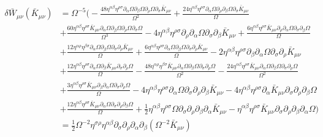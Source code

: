 \documentclass[10pt,letterpaper]{article}
\newcommand{\pd}{\partial}
\numberwithin{equation}{section}
\begin{document}
\begin{align}
	\delta \bar W_{\mu\nu}(\bar K_{\mu\nu})&= 
\Omega^{-5}\bigg(- \frac{48 \eta^{\alpha \beta} \eta^{\rho \sigma} \partial_{\alpha}\Omega \partial_{\beta}\Omega \partial_{\rho}\Omega \partial_{\sigma}\bar K_{\mu \nu}}{\Omega^2} + \frac{24 \eta^{\alpha \beta} \eta^{\rho \sigma} \partial_{\alpha}\Omega \partial_{\rho}\partial_{\beta}\Omega \partial_{\sigma}\bar K_{\mu \nu}}{\Omega}  \\
& + \frac{60 \eta^{\alpha \beta} \eta^{\rho \sigma} \bar K_{\mu \nu} \partial_{\alpha}\Omega \partial_{\beta}\Omega \partial_{\rho}\Omega \partial_{\sigma}\Omega}{\Omega^3} - 4 \eta^{\alpha \beta} \eta^{\rho \sigma} \partial_{\rho}\partial_{\alpha}\Omega \partial_{\sigma}\partial_{\beta}\bar K_{\mu \nu} + \frac{6 \eta^{\alpha \beta} \eta^{\rho \sigma} \bar K_{\mu \nu} \partial_{\rho}\partial_{\alpha}\Omega \partial_{\sigma}\partial_{\beta}\Omega}{\Omega} \nonumber \\
& + \frac{12 \eta^{\alpha \rho} \eta^{\beta \sigma} \partial_{\alpha}\Omega \partial_{\beta}\Omega \partial_{\sigma}\partial_{\rho}\bar K_{\mu \nu}}{\Omega} + \frac{6 \eta^{\alpha \beta} \eta^{\rho \sigma} \partial_{\alpha}\Omega \partial_{\beta}\Omega \partial_{\sigma}\partial_{\rho}\bar K_{\mu \nu}}{\Omega} - 2 \eta^{\alpha \beta} \eta^{\rho \sigma} \partial_{\beta}\partial_{\alpha}\Omega \partial_{\sigma}\partial_{\rho}\bar K_{\mu \nu}  \nonumber \\
& + \frac{12 \eta^{\alpha \beta} \eta^{\rho \sigma} \partial_{\alpha}\Omega \partial_{\beta}\bar K_{\mu \nu} \partial_{\sigma}\partial_{\rho}\Omega}{\Omega} -  \frac{48 \eta^{\alpha \rho} \eta^{\beta \sigma} \bar K_{\mu \nu} \partial_{\alpha}\Omega \partial_{\beta}\Omega \partial_{\sigma}\partial_{\rho}\Omega}{\Omega^2} -  \frac{24 \eta^{\alpha \beta} \eta^{\rho \sigma} \bar K_{\mu \nu} \partial_{\alpha}\Omega \partial_{\beta}\Omega \partial_{\sigma}\partial_{\rho}\Omega}{\Omega^2} \nonumber \\
& + \frac{3 \eta^{\alpha \beta} \eta^{\rho \sigma} \bar K_{\mu \nu} \partial_{\beta}\partial_{\alpha}\Omega \partial_{\sigma}\partial_{\rho}\Omega}{\Omega} - 4 \eta^{\alpha \beta} \eta^{\rho \sigma} \partial_{\alpha}\Omega \partial_{\sigma}\partial_{\rho}\partial_{\beta}\bar K_{\mu \nu} - 4 \eta^{\alpha \beta} \eta^{\rho \sigma} \partial_{\alpha}\bar K_{\mu \nu} \partial_{\sigma}\partial_{\rho}\partial_{\beta}\Omega  \nonumber \\
&+ \frac{12 \eta^{\alpha \beta} \eta^{\rho \sigma} \bar K_{\mu \nu} \partial_{\alpha}\Omega \partial_{\sigma}\partial_{\rho}\partial_{\beta}\Omega}{\Omega} + \tfrac{1}{2} \eta^{\alpha \beta} \eta^{\rho \sigma} \Omega \partial_{\sigma}\partial_{\rho}\partial_{\beta}\partial_{\alpha}\bar K_{\mu \nu} -  \eta^{\alpha \beta} \eta^{\rho \sigma} \bar K_{\mu \nu} \partial_{\sigma}\partial_{\rho}\partial_{\beta}\partial_{\alpha}\Omega  \bigg) \nonumber \\
&= \frac12 \Omega^{-2} \eta^{\sigma\rho}\eta^{\alpha\beta}\pd_\sigma\pd_\rho\pd_\alpha \pd_\beta (\Omega^{-2}\bar K_{\mu\nu}) \nonumber
\end{align}
\\ 
\end{document}
